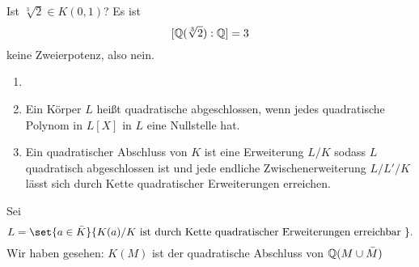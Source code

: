 \begin{Kor}[Würfelverdoppelung]
Ist $\sqrt[3]{2}\in K(0,1)$? Es ist $$[\mathbb{Q}(\sqrt[3]{2}):\mathbb{Q}]=3$$ keine Zweierpotenz, also nein.
    
\end{Kor}
\begin{Def}
    \begin{enumerate}
        \item[]
        \item Ein Körper $L$ heißt quadratische abgeschlossen, wenn jedes quadratische Polynom in $L[X]$ in $L$ eine Nullstelle hat.
        \item Ein quadratischer Abschluss von $K$ ist eine Erweiterung $L/K$ sodass $L$ quadratisch abgeschlossen ist und jede endliche Zwischenerweiterung $L/L'/K$ lässt sich durch Kette quadratischer Erweiterungen erreichen.
    \end{enumerate}
\end{Def}
\begin{Bem}
    Sei $$L=\set{a\in\bar K}{ K(a)/K \text{ ist durch Kette quadratischer Erweiterungen erreichbar }}.$$
    Wir haben gesehen: $K(M)$ ist der quadratische Abschluss von $\mathbb{Q}(M\cup\bar M)$
\end{Bem}
